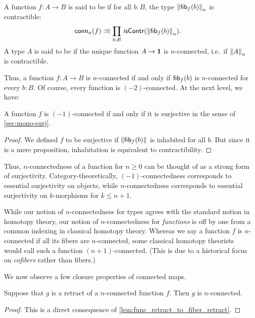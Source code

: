 \begin{defn}
A function $f:A\to B$ is said to be  if for all $b:B$, the type $\trunc n{\hfiber f b}$ is contractible:
\begin{equation*}
  \mathsf{conn}_n(f)\defeq \prd{b:B}\iscontr(\trunc n{\hfiber{f}b}). 
\end{equation*}
A type $A$ is said to be  if the unique function $A\to\unit$ is $n$-connected, i.e.\ if $\trunc nA$ is contractible.
\end{defn}

Thus, a function $f:A\to B$ is $n$-connected if and only if $\hfib{f}b$ is $n$-connected for every $b:B$.
Of course, every function is $(-2)$-connected.
At the next level, we have:

\begin{lem}
  A function $f$ is $(-1)$-connected if and only if it is surjective in the sense of \autoref{sec:mono-surj}.
\end{lem}
\begin{proof}
  We defined $f$ to be surjective if $\brck{\hfiber f b}$ is inhabited for all $b$.
  But since it is a mere proposition, inhabitation is equivalent to contractibility.
\end{proof}

Thus, $n$-connectedness of a function for $n\ge 0$ can be thought of as a strong form of surjectivity.
Category-theoretically, $(-1)$-connectedness corresponds to essential surjectivity on objects, while $n$-connectedness corresponds to essential surjectivity on $k$-morphisms for $k\le n+1$.

\begin{rmk}
  While our notion of $n$-connectedness for types agrees with the standard notion in homotopy theory, our notion of $n$-connectedness for \emph{functions} is off by one from a common indexing in classical homotopy theory.
  Whereas we say a function $f$ is $n$-connected if all its fibers are $n$-connected, some classical homotopy theorists would call such a function $(n+1)$-connected.
  (This is due to a historical focus on \emph{cofibers} rather than fibers.)
\end{rmk}

We now observe a few closure properties of connected maps.

\begin{lem}
Suppose that $g$ is a retract of a $n$-connected function $f$.  Then $g$ is
$n$-connected.
\end{lem}
\begin{proof}
This is a direct consequence of \autoref{lem:func_retract_to_fiber_retract}.
\end{proof}

